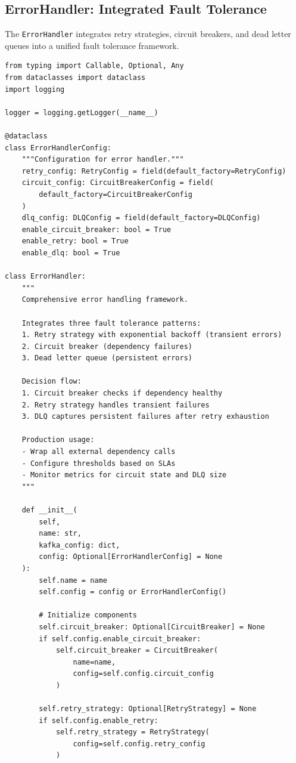 \subsection{ErrorHandler: Integrated Fault Tolerance}

The \texttt{ErrorHandler} integrates retry strategies, circuit breakers, and dead letter queues into a unified fault tolerance framework.

\begin{lstlisting}[style=python, caption={Comprehensive Error Handler}]
from typing import Callable, Optional, Any
from dataclasses import dataclass
import logging

logger = logging.getLogger(__name__)

@dataclass
class ErrorHandlerConfig:
    """Configuration for error handler."""
    retry_config: RetryConfig = field(default_factory=RetryConfig)
    circuit_config: CircuitBreakerConfig = field(
        default_factory=CircuitBreakerConfig
    )
    dlq_config: DLQConfig = field(default_factory=DLQConfig)
    enable_circuit_breaker: bool = True
    enable_retry: bool = True
    enable_dlq: bool = True

class ErrorHandler:
    """
    Comprehensive error handling framework.

    Integrates three fault tolerance patterns:
    1. Retry strategy with exponential backoff (transient errors)
    2. Circuit breaker (dependency failures)
    3. Dead letter queue (persistent errors)

    Decision flow:
    1. Circuit breaker checks if dependency healthy
    2. Retry strategy handles transient failures
    3. DLQ captures persistent failures after retry exhaustion

    Production usage:
    - Wrap all external dependency calls
    - Configure thresholds based on SLAs
    - Monitor metrics for circuit state and DLQ size
    """

    def __init__(
        self,
        name: str,
        kafka_config: dict,
        config: Optional[ErrorHandlerConfig] = None
    ):
        self.name = name
        self.config = config or ErrorHandlerConfig()

        # Initialize components
        self.circuit_breaker: Optional[CircuitBreaker] = None
        if self.config.enable_circuit_breaker:
            self.circuit_breaker = CircuitBreaker(
                name=name,
                config=self.config.circuit_config
            )

        self.retry_strategy: Optional[RetryStrategy] = None
        if self.config.enable_retry:
            self.retry_strategy = RetryStrategy(
                config=self.config.retry_config
            )


\end{lstlisting}

